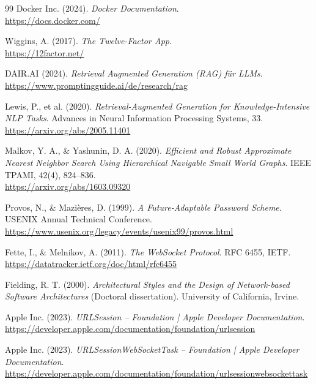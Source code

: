 \begin{thebibliography}{99}
Docker Inc. (2024).
\textit{Docker Documentation}.\\
\url{https://docs.docker.com/}

Wiggins, A. (2017).
\textit{The Twelve-Factor App}.\\
\url{https://12factor.net/}


DAIR.AI (2024).
\textit{Retrieval Augmented Generation (RAG) für LLMs}.\\
\url{https://www.promptingguide.ai/de/research/rag}

Lewis, P., et al. (2020).
\textit{Retrieval-Augmented Generation for Knowledge-Intensive NLP Tasks}.
Advances in Neural Information Processing Systems, 33.\\
\url{https://arxiv.org/abs/2005.11401}

Malkov, Y. A., \& Yashunin, D. A. (2020).
\textit{Efficient and Robust Approximate Nearest Neighbor Search Using Hierarchical Navigable Small World Graphs}.
IEEE TPAMI, 42(4), 824--836.\\
\url{https://arxiv.org/abs/1603.09320}

Provos, N., \& Mazières, D. (1999).
\textit{A Future-Adaptable Password Scheme}. USENIX Annual Technical Conference.\\
\url{https://www.usenix.org/legacy/events/usenix99/provos.html}


Fette, I., \& Melnikov, A. (2011).
\textit{The WebSocket Protocol}. RFC 6455, IETF.\\
\url{https://datatracker.ietf.org/doc/html/rfc6455}

Fielding, R. T. (2000).
\textit{Architectural Styles and the Design of Network-based Software Architectures} (Doctoral dissertation). University of California, Irvine.


Apple Inc. (2023).
\textit{URLSession -- Foundation | Apple Developer Documentation}.\\
\url{https://developer.apple.com/documentation/foundation/urlsession}

Apple Inc. (2023).
\textit{URLSessionWebSocketTask -- Foundation | Apple Developer Documentation}.\\
\url{https://developer.apple.com/documentation/foundation/urlsessionwebsockettask}


\end{thebibliography}
